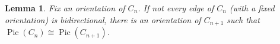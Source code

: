 \documentclass[11pt,reqno]{amsart}
\DeclareMathOperator{\Pic}{Pic}
\theoremstyle{definition}
\newtheorem{myeg}[mydef]{Example}
\theoremstyle{plain}
\newtheorem{lem}[mydef]{Lemma}
\begin{document}



		

\begin{lem} \label{obj0}
Fix an orientation of $C_n$. If not every edge of $C_n$ (with a fixed orientation) is bidirectional, there is an orientation of $C_{n+1}$ such that $\Pic (C_n) \cong \Pic (C_{n+1})$. 
\end{lem}
\end{document}
